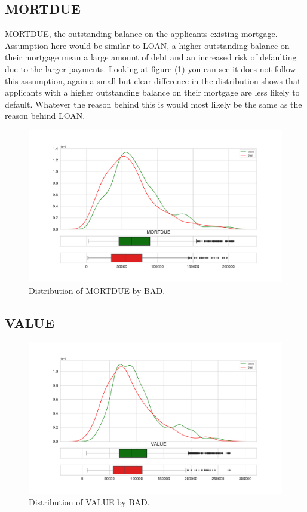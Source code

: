 \subsection*{MORTDUE}

MORTDUE, the outstanding balance on the applicants existing mortgage. Assumption here would be similar to LOAN, a higher outstanding balance on their mortgage mean a large amount of debt and an increased risk of defaulting due to the larger payments. Looking at figure (\ref{mortdue_dist}) you can see it does not follow this assumption, again a small but clear difference in the distribution shows that applicants with a higher outstanding balance on their mortgage are less likely to default. Whatever the reason behind this is would most likely be the same as the reason behind LOAN.

\begin{figure}[!ht]
	\centering
	\includegraphics[scale=0.40]{figs/mortdue_dist.pdf}
	\caption{Distribution of MORTDUE by BAD. \label{mortdue_dist}}
\end{figure}

\subsection*{VALUE}

\begin{figure}[!ht]
	\centering
	\includegraphics[scale=0.40]{figs/value_dist.pdf}
	\caption{Distribution of VALUE by BAD. \label{value_dist}}
\end{figure}

